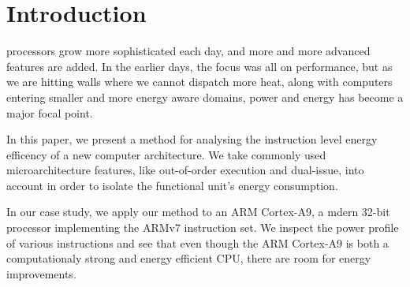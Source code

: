 \section{Introduction}

 processors grow more sophisticated each day, and
more and more advanced features are added. In the earlier days, the focus
was all on performance, but as we are hitting walls where we cannot dispatch
more heat, along with computers entering smaller and more energy aware domains,
power and energy has become a major focal point.

In this paper, we present a method for analysing the instruction level energy
efficency of a new computer architecture. We take commonly used
microarchitecture features, like out-of-order execution and dual-issue, into
account in order to isolate the functional unit's energy consumption.

In our case study, we apply our method to an ARM Cortex-A9, a mdern 32-bit
processor implementing the ARMv7 instruction set. We inspect the power
profile of various instructions and see that even though the ARM
Cortex-A9 is both a computationaly strong and energy efficient CPU, there are
room for energy improvements.


